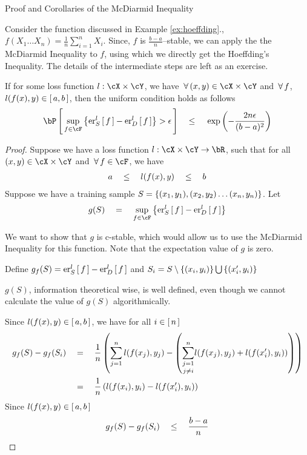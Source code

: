 \documentclass[11pt,a4paper]{article}
\begin{document}
\begin{ssection}{Proof and Corollaries of the McDiarmid Inequality}
	\setcounter{theorem}{1}
	\begin{corollary}
		Consider the function discussed in Example \ref{ex:hoeffding}., \ie $f(X_1 \dots X_n) = \frac{1}{n} \sum_{i = 1}^n X_i$. Since, $f$ is $\frac{b-a}{n}$--stable, we can apply the the McDiarmid Inequality to $f$, using which we directly get the Hoeffding's Inequality. The details of the intermediate steps are left as an exercise.
		\end {corollary} \br
		
		\begin{corollary}
			If for some loss function $l : \cX \times \cY$, we have $\qforall (x, y) \in \cX \times \cY$ and $\qforall f$, $l(f(x), y) \in \brac{a, b}$, then the uniform condition holds as follows
			\begin{align*}
				\prob{\sup_{f \in \cF} \set{\err[_S^l]{f} - \err[_D^l]{f}} > \epsilon}	\qle	\texp{- \frac{2n \epsilon}{(b - a)^2}} 
			\end{align*}
		\end{corollary}
		\begin{proof}
			Suppose we have a loss function $l : \cX \times \cY \ra \bR$, such that for all $(x, y) \in \cX \times \cY$ and $\qforall f \in \cF$, we have
			\begin{align*}
				a \qle	l(f(x), y)	\qle b 
			\end{align*}
			Suppose we have a training sample $S = \set{(x_1, y_1), (x_2, y_2) \dots (x_n, y_n)}$. Let
			\begin{align*}
				g(S)	\eq	\sup_{f \in \cF} \set{\err[_S^l]{f} - \err[_D^l]{f}} 
			\end{align*}
			
			We want to show that $g$ is c-stable, which would allow us to use the McDiarmid Inequality for this function. Note that the expectation value of $g$ is zero.
			
			Define $g_f(S) = \err[_S^l]{f} - \err[_D^l]{f}$ and $S_i = S \setminus \set{(x_i, y_i)} \bigcup \set{(x_i', y_i)}$ \br
			
			\begin{remark}
				$g(S)$, information theoretical wise, is well defined, even though we cannot calculate the value of $g(S)$ algorithmically.
			\end{remark}
			
			Since $l(f(x), y) \in \brac{a, b}$, we have for all $i \in \brac{n}$
			\begin{align*}
				g_f(S) - g_f(S_i) & \eq	\frac{1}{n} \para{\sum_{j = 1}^n l(f(x_j), y_j) - \para{\underset{j \ne i}{\sum_{j = 1}^n} l(f(x_j), y_j) + l(f(x_i'), y_i))}} \\
				                  & \eq	\frac{1}{n} \para{l(f(x_i), y_i) - l(f(x_i'), y_i)}                                                                            \\
			\end{align*}
			Since $l(f(x), y) \in \brac{a, b}$
			\begin{equation}
				g_f(S) - g_f(S_i)	\qle	\frac{b - a}{n}
				\label{eq:c-stable-uniform}
			\end{equation}
			

\end{proof}
\end{ssection}
\end{document}
